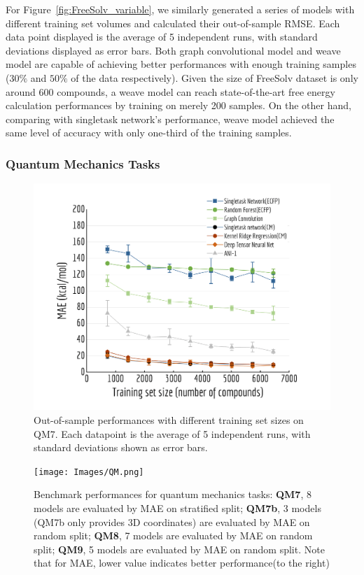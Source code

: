 For Figure~\ref{fig:FreeSolv_variable}, we similarly generated a series of models with different training set volumes and calculated their out-of-sample RMSE. Each data point displayed is the average of 5 independent runs, with standard deviations displayed as error bars. Both graph convolutional model and weave model are capable of achieving better performances with enough training samples ($30\%$ and $50\%$ of the data respectively). Given the size of FreeSolv dataset is only around 600 compounds, a weave model can reach state-of-the-art free energy calculation performances by training on merely 200 samples. On the other hand, comparing with singletask network's performance, weave model achieved the same level of accuracy with only one-third of the training samples.

\subsubsection{Quantum Mechanics Tasks}

\begin{figure}[htbp]
  \centering
  \includegraphics[width=.45\textwidth]{Images/QM7_variable.png}
  \caption{Out-of-sample performances with different training set sizes on QM7. Each datapoint is the average of 5 independent runs, with standard deviations shown as error bars.}
  \label{fig:QM7_variable}
\end{figure}

\begin{figure}[htbp]
  \centering
  \texttt{[image: Images/QM.png]}
  \caption{Benchmark performances for quantum mechanics tasks: \textbf{QM7}, 8 models are evaluated by MAE on stratified split; \textbf{QM7b}, 3 models (QM7b only provides 3D coordinates) are evaluated by MAE on random split; \textbf{QM8}, 7 models are evaluated by MAE on random split; \textbf{QM9}, 5 models are evaluated by MAE on random split. Note that for MAE, lower value indicates better performance(to the right)}
  \label{fig:QM}
\end{figure}

